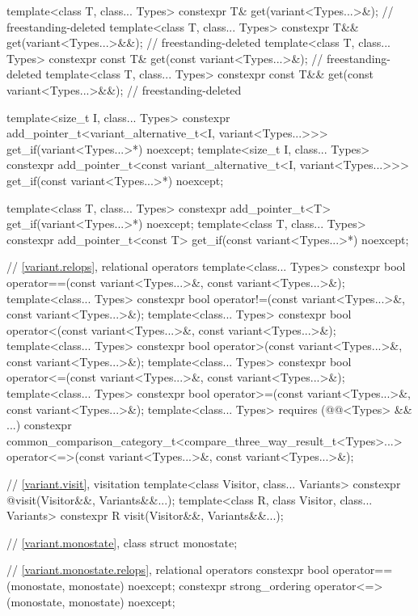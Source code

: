 \begin{codeblock}
{  template<class T, class... Types>
    constexpr T& get(variant<Types...>&);                               // freestanding-deleted
  template<class T, class... Types>
    constexpr T&& get(variant<Types...>&&);                             // freestanding-deleted
  template<class T, class... Types>
    constexpr const T& get(const variant<Types...>&);                   // freestanding-deleted
  template<class T, class... Types>
    constexpr const T&& get(const variant<Types...>&&);                 // freestanding-deleted

  template<size_t I, class... Types>
    constexpr add_pointer_t<variant_alternative_t<I, variant<Types...>>>
      get_if(variant<Types...>*) noexcept;
  template<size_t I, class... Types>
    constexpr add_pointer_t<const variant_alternative_t<I, variant<Types...>>>
      get_if(const variant<Types...>*) noexcept;

  template<class T, class... Types>
    constexpr add_pointer_t<T>
      get_if(variant<Types...>*) noexcept;
  template<class T, class... Types>
    constexpr add_pointer_t<const T>
      get_if(const variant<Types...>*) noexcept;

  // \ref{variant.relops}, relational operators
  template<class... Types>
    constexpr bool operator==(const variant<Types...>&, const variant<Types...>&);
  template<class... Types>
    constexpr bool operator!=(const variant<Types...>&, const variant<Types...>&);
  template<class... Types>
    constexpr bool operator<(const variant<Types...>&, const variant<Types...>&);
  template<class... Types>
    constexpr bool operator>(const variant<Types...>&, const variant<Types...>&);
  template<class... Types>
    constexpr bool operator<=(const variant<Types...>&, const variant<Types...>&);
  template<class... Types>
    constexpr bool operator>=(const variant<Types...>&, const variant<Types...>&);
  template<class... Types> requires (@@<Types> && ...)
    constexpr common_comparison_category_t<compare_three_way_result_t<Types>...>
      operator<=>(const variant<Types...>&, const variant<Types...>&);

  // \ref{variant.visit}, visitation
  template<class Visitor, class... Variants>
    constexpr @\seebelow@ visit(Visitor&&, Variants&&...);
  template<class R, class Visitor, class... Variants>
    constexpr R visit(Visitor&&, Variants&&...);

  // \ref{variant.monostate}, class 
  struct monostate;

  // \ref{variant.monostate.relops},  relational operators
  constexpr bool operator==(monostate, monostate) noexcept;
  constexpr strong_ordering operator<=>(monostate, monostate) noexcept;

}
\end{codeblock}
